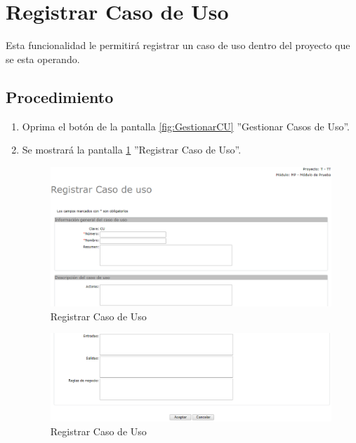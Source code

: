 
\hypertarget{cv:registrarCU}{\section{Registrar Caso de Uso}} \label{sec:registrarCU}

	Esta funcionalidad le permitirá registrar un caso de uso dentro del proyecto que se esta operando.

		\subsection{Procedimiento}

			\begin{enumerate}
	
			\item Oprima el botón \IURegistrar{} de la pantalla \ref{fig:GestionarCU} ''Gestionar Casos de Uso''.
			
			\item Se mostrará la pantalla \ref{fig:registrarCUA} ''Registrar Caso de Uso''.

			\begin{figure}[H]
				\begin{center}
					\includegraphics[scale=0.6]{roles/lider/casosUso/pantallas/IU12-1registrarCUA}
					\caption{Registrar Caso de Uso}
					\label{fig:registrarCUA}
				\end{center}
			\end{figure}
		
		\begin{figure}[H]
			\begin{center}
				\includegraphics[scale=0.6]{roles/lider/casosUso/pantallas/IU12-1registrarCUB}
				\caption{Registrar Caso de Uso}
				\label{fig:registrarCUB}
			\end{center}
		\end{figure}
		

\end{enumerate}
